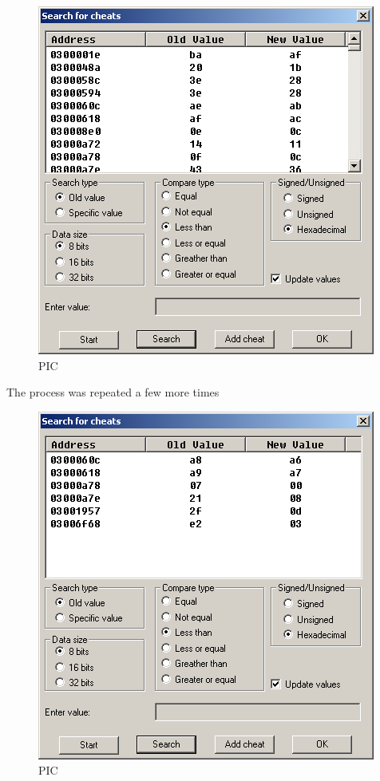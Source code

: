 \documentclass[
]{book}
\begin{document}
\begin{figure}
\centering
\includegraphics{images/204_home_fast6191_romhackingguide_unrenamed_fil___ginal_borders_romhackingguidecheatexample_4.png}
\caption{PIC}
\end{figure}

The process was repeated a few more times

\begin{figure}
\centering
\includegraphics{images/205_home_fast6191_romhackingguide_unrenamed_fil___ginal_borders_romhackingguidecheatexample_5.png}
\caption{PIC}
\end{figure}
\end{document}
